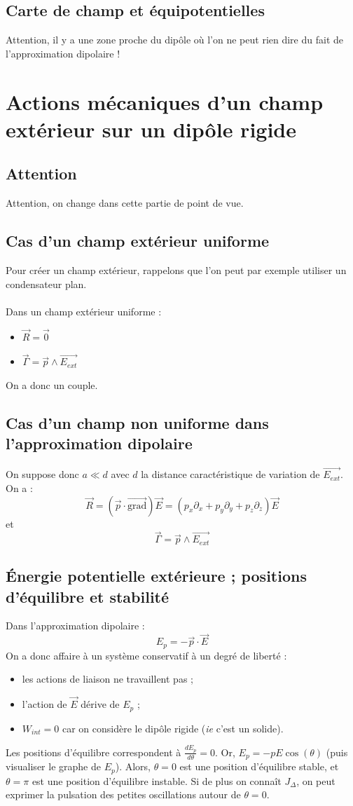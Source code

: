 \documentclass[french]{book}
\theoremstyle{plain}
\theoremstyle{definition}
\theoremstyle{remark}
\newcommand{\grad}{\overrightarrow{\text{grad}}}
\begin{document}
\subsection{Carte de champ et équipotentielles}
Attention, il y a une zone proche du dipôle où l'on ne peut rien dire du fait de l'approximation dipolaire !
\section{Actions mécaniques d'un champ extérieur sur un dipôle rigide}
\subsection{Attention}
Attention, on change dans cette partie de point de vue.
\subsection{Cas d'un champ extérieur uniforme}
Pour créer un champ extérieur, rappelons que l'on peut par exemple utiliser un condensateur plan. \\ \\
Dans un champ extérieur uniforme :
\begin{itemize}
	\item $\overrightarrow{R}=\overrightarrow{0}$
	\item $\overrightarrow{\Gamma}=\overrightarrow{p}\wedge\overrightarrow{E_{ext}}$
\end{itemize}
On a donc un couple.
\subsection{Cas d'un champ non uniforme dans l'approximation dipolaire}
On suppose donc $a\ll d$ avec $d$ la distance caractéristique de variation de $\overrightarrow{E_{ext}}$. On a : $$\overrightarrow{R}=(\overrightarrow{p}\cdot\grad)\overrightarrow{E}=(p_x\partial_x+p_y\partial_y+p_z\partial_z)\overrightarrow{E}$$
et $$\overrightarrow{\Gamma}=\overrightarrow{p}\wedge\overrightarrow{E_{ext}}$$
\subsection{Énergie potentielle extérieure ; positions d'équilibre et stabilité}
Dans l'approximation dipolaire : $$E_p=-\overrightarrow{p}\cdot\overrightarrow{E}$$ On a donc affaire à un système conservatif à un degré de liberté : 
\begin{itemize}
	\item les actions de liaison ne travaillent pas ;
	\item l'action de $\overrightarrow{E}$ dérive de $E_p$ ;
	\item $W_{int}=0$ car on considère le dipôle rigide (\textit{ie} c'est un solide).
\end{itemize}
Les positions d'équilibre correspondent à $\displaystyle\frac{dE_p}{d\theta}=0$. Or, $E_p=-pE\cos(\theta)$ (puis visualiser le graphe de $E_p$). Alors, $\theta=0$ est une position d'équilibre stable, et $\theta=\pi$ est une position d'équilibre instable. Si de plus on connaît $J_\Delta$, on peut exprimer la pulsation des petites oscillations autour de $\theta=0$.
\end{document}
